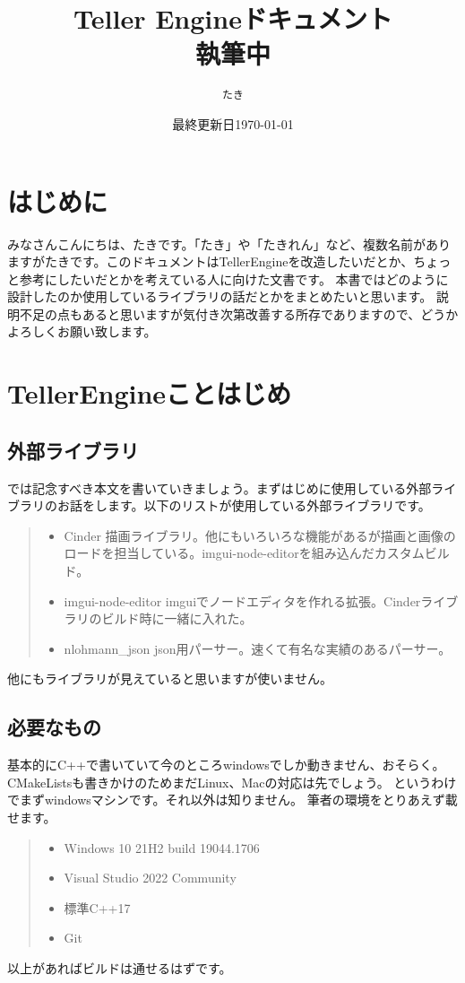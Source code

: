 \documentclass[12pt,a4paper,uplatex,dvipdfmx]{jsarticle}
\begin{document}
\title{Teller Engineドキュメント\\ \bfseries{執筆中}}
\author{\texttt{たき}}
\date{最終更新日\today}

\maketitle
\section*{はじめに}
みなさんこんにちは、たきです。「たき」や「たきれん」など、複数名前がありますがたきです。このドキュメントはTellerEngineを改造したいだとか、ちょっと参考にしたいだとかを考えている人に向けた文書です。
本書ではどのように設計したのか使用しているライブラリの話だとかをまとめたいと思います。
説明不足の点もあると思いますが気付き次第改善する所存でありますので、どうかよろしくお願い致します。
\newpage
\tableofcontents
\newpage
\section{TellerEngineことはじめ}
\subsection{外部ライブラリ}
では記念すべき本文を書いていきましょう。まずはじめに使用している外部ライブラリのお話をします。以下のリストが使用している外部ライブラリです。

\begin{quote}
  \begin{itemize}
    \item Cinder 描画ライブラリ。他にもいろいろな機能があるが描画と画像のロードを担当している。imgui-node-editorを組み込んだカスタムビルド。
    \item imgui-node-editor imguiでノードエディタを作れる拡張。Cinderライブラリのビルド時に一緒に入れた。
    \item nlohmann\_json json用パーサー。速くて有名な実績のあるパーサー。
  \end{itemize}
\end{quote}
他にもライブラリが見えていると思いますが使いません。
\subsection{必要なもの}
基本的にC++で書いていて今のところwindowsでしか動きません、おそらく。CMakeListsも書きかけのためまだLinux、Macの対応は先でしょう。
というわけでまずwindowsマシンです。それ以外は知りません。
筆者の環境をとりあえず載せます。
\begin{quote}
  \begin{itemize}
    \item Windows 10 21H2 build 19044.1706
    \item Visual Studio 2022 Community
    \item 標準C++17
    \item Git
  \end{itemize}
\end{quote}
以上があればビルドは通せるはずです。
\end{document}
